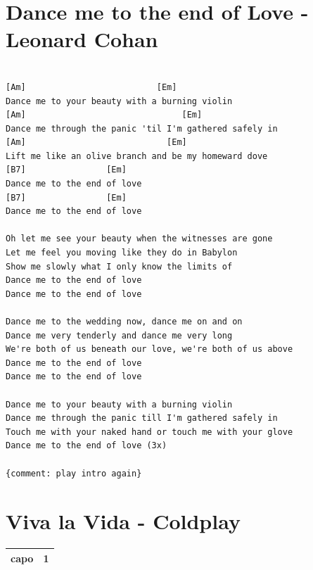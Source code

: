 \documentclass[
]{book}
\let\stdsection\section
\renewcommand\section{\clearpage\stdsection}
\begin{document}
\hypertarget{dance-me-to-the-end-of-love---leonard-cohan}{%
\section{Dance me to the end of Love - Leonard Cohan}\label{dance-me-to-the-end-of-love---leonard-cohan}}

\begin{verbatim}

[Am]                          [Em]
Dance me to your beauty with a burning violin
[Am]                               [Em]
Dance me through the panic 'til I'm gathered safely in
[Am]                            [Em]
Lift me like an olive branch and be my homeward dove
[B7]                [Em]
Dance me to the end of love
[B7]                [Em]
Dance me to the end of love

Oh let me see your beauty when the witnesses are gone 
Let me feel you moving like they do in Babylon 
Show me slowly what I only know the limits of 
Dance me to the end of love 
Dance me to the end of love 

Dance me to the wedding now, dance me on and on 
Dance me very tenderly and dance me very long 
We're both of us beneath our love, we're both of us above 
Dance me to the end of love 
Dance me to the end of love

Dance me to your beauty with a burning violin 
Dance me through the panic till I'm gathered safely in 
Touch me with your naked hand or touch me with your glove 
Dance me to the end of love (3x)

{comment: play intro again}
\end{verbatim}

\hypertarget{viva-la-vida---coldplay}{%
\section{Viva la Vida - Coldplay}\label{viva-la-vida---coldplay}}

\begin{longtable}[]{@{}ll@{}}
\toprule
\endhead
capo & 1\tabularnewline
\bottomrule
\end{longtable}
\end{document}
